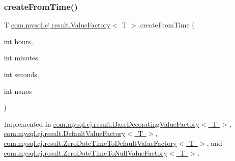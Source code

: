 \mbox{\label{interfacecom_1_1mysql_1_1cj_1_1result_1_1_value_factory_a5edf0bed225d34bd1fade72d8f106760}} 
\subsubsection{\texorpdfstring{create\+From\+Time()}{createFromTime()}}
{\footnotesize\ttfamily T \mbox{\hyperlink{interfacecom_1_1mysql_1_1cj_1_1result_1_1_value_factory}{com.\+mysql.\+cj.\+result.\+Value\+Factory}}$<$ T $>$.create\+From\+Time (\begin{DoxyParamCaption}\item[{int}]{hours,  }\item[{int}]{minutes,  }\item[{int}]{seconds,  }\item[{int}]{nanos }\end{DoxyParamCaption})}



Implemented in \mbox{\hyperlink{classcom_1_1mysql_1_1cj_1_1result_1_1_base_decorating_value_factory_a596f4a15a63fa7f42aa6116fc52f40aa}{com.\+mysql.\+cj.\+result.\+Base\+Decorating\+Value\+Factory$<$ T $>$}}, \mbox{\hyperlink{classcom_1_1mysql_1_1cj_1_1result_1_1_default_value_factory_af1cd4fa518f703b1eee37b00365f808b}{com.\+mysql.\+cj.\+result.\+Default\+Value\+Factory$<$ T $>$}}, \mbox{\hyperlink{classcom_1_1mysql_1_1cj_1_1result_1_1_zero_date_time_to_default_value_factory_a97adb0b51c3cf9d2bd908ea650f25f2d}{com.\+mysql.\+cj.\+result.\+Zero\+Date\+Time\+To\+Default\+Value\+Factory$<$ T $>$}}, and \mbox{\hyperlink{classcom_1_1mysql_1_1cj_1_1result_1_1_zero_date_time_to_null_value_factory_a22e98e55a6975488e6f74fb406141a31}{com.\+mysql.\+cj.\+result.\+Zero\+Date\+Time\+To\+Null\+Value\+Factory$<$ T $>$}}.

\mbox{\label{interfacecom_1_1mysql_1_1cj_1_1result_1_1_value_factory_accbdc6c6970a22e40a0b1d72213334e6}} 
